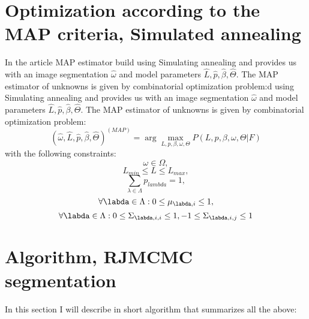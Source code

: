 \documentclass[journal]{IEEEtran}
\begin{document}
\section{Optimization according to the MAP criteria, Simulated annealing}
In the article MAP estimator build using Simulating annealing and provides us with an image segmentation $\widehat{\omega}$ and model parameters $\widehat{L},\widehat{p},\widehat{\beta},\widehat{\Theta}$. The MAP estimator of unknowns is given by combinatorial optimization problem:d using Simulating annealing and provides us with an image segmentation $\widehat{\omega}$ and model parameters $\widehat{L},\widehat{p},\widehat{\beta},\widehat{\Theta}$. The MAP estimator of unknowns is given by combinatorial optimization problem:
\begin{equation}
\left(\widehat{\omega},\widehat{L},\widehat{p},\widehat{\beta},\widehat{\Theta}\right)^{\left(MAP\right)} = 
\arg \max\limits_{L,p,\beta,\omega,\Theta}P\left(L,p,\beta,\omega,\Theta\left|\right.F\right) 
\end{equation}
with the following constraints:
\begin{equation}
\omega \in \Omega,
\end{equation}
\begin{equation}
L_{min} \leq L \leq L_{max},
\end{equation}
\begin{equation}
\sum\limits_{\lambda\in\Lambda}p_{lambda} = 1,
\end{equation}
\begin{equation}
\forall\labda\in\Lambda : 0 \leq \mu_{\labda,i} \leq 1,
\end{equation}
\begin{equation}
\forall\labda\in\Lambda : 0 \leq \Sigma_{\labda,i,i} \leq 1, -1 \leq \Sigma_{\labda,i,j} \leq 1
\end{equation}


\section{Algorithm, RJMCMC segmentation}
In this section I will describe in short algorithm that summarizes all the above:
\end{document}
